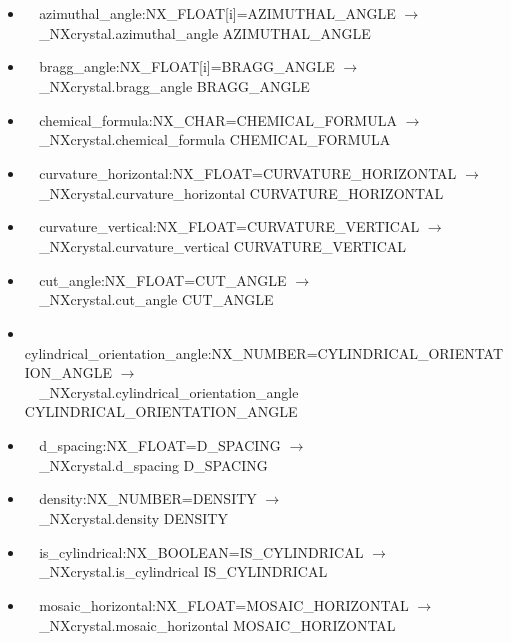 \documentclass[11pt]{article}
\begin{document}
{{\begin{itemize}
\item{\verb|  |azimuthal\_angle:NX\_FLOAT[i]=AZIMUTHAL\_ANGLE $\rightarrow$\\
\verb|  |\_NXcrystal.azimuthal\_angle AZIMUTHAL\_ANGLE}

\item{\verb|  |bragg\_angle:NX\_FLOAT[i]=BRAGG\_ANGLE $\rightarrow$\\
\verb|  |\_NXcrystal.bragg\_angle BRAGG\_ANGLE}

\item{\verb|  |chemical\_formula:NX\_CHAR=CHEMICAL\_FORMULA $\rightarrow$\\
\verb|  |\_NXcrystal.chemical\_formula CHEMICAL\_FORMULA}

\item{\verb|  |curvature\_horizontal:NX\_FLOAT=CURVATURE\_HORIZONTAL $\rightarrow$\\
\verb|  |\_NXcrystal.curvature\_horizontal CURVATURE\_HORIZONTAL}

\item{\verb|  |curvature\_vertical:NX\_FLOAT=CURVATURE\_VERTICAL $\rightarrow$\\
\verb|  |\_NXcrystal.curvature\_vertical CURVATURE\_VERTICAL}

\item{\verb|  |cut\_angle:NX\_FLOAT=CUT\_ANGLE $\rightarrow$\\
\verb|  |\_NXcrystal.cut\_angle CUT\_ANGLE}

\item{\verb|  |cylindrical\_orientation\_angle:NX\_NUMBER=CYLINDRICAL\_ORIENTATION\_ANGLE $\rightarrow$\\
\verb|  |\_NXcrystal.cylindrical\_orientation\_angle CYLINDRICAL\_ORIENTATION\_ANGLE}

\item{\verb|  |d\_spacing:NX\_FLOAT=D\_SPACING $\rightarrow$\\
\verb|  |\_NXcrystal.d\_spacing D\_SPACING}

\item{\verb|  |density:NX\_NUMBER=DENSITY $\rightarrow$\\
\verb|  |\_NXcrystal.density DENSITY}

\item{\verb|  |is\_cylindrical:NX\_BOOLEAN=IS\_CYLINDRICAL $\rightarrow$\\
\verb|  |\_NXcrystal.is\_cylindrical IS\_CYLINDRICAL}

\item{\verb|  |mosaic\_horizontal:NX\_FLOAT=MOSAIC\_HORIZONTAL $\rightarrow$\\
\verb|  |\_NXcrystal.mosaic\_horizontal MOSAIC\_HORIZONTAL}


\end{itemize}}}
\end{document}
